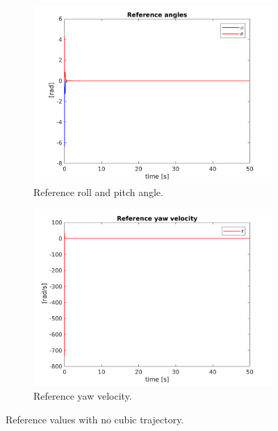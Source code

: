 \documentclass[11pt,a4paper]{scrartcl}
\begin{document}
\begin{figure}[h]
	\begin{subfigure}[h!]{0.5\linewidth}
		\centering
		\includegraphics[width=\textwidth]{Images/AngleOuterNO.png}
		\caption{Reference roll and pitch angle.}
		\label{fig:outercontrolanglesNO}
	\end{subfigure}	
	\begin{subfigure}[h!]{0.5\linewidth}
		\centering
		\includegraphics[width=\textwidth]{Images/velOuterNO.png}
		\caption{Reference yaw velocity.}
		\label{fig:outercontrolvelNO}
	\end{subfigure}	
\caption{Reference values with no cubic trajectory.}
\end{figure}
\end{document}
